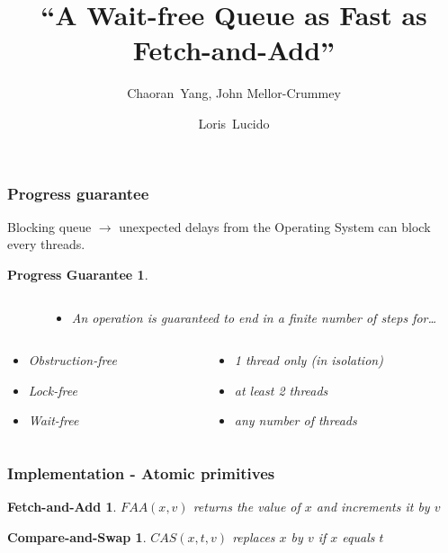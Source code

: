 \documentclass[10pt,a4paper]{beamer}
\title{``A Wait-free Queue as Fast as Fetch-and-Add'' }
\subtitle{Chaoran~Yang, John Mellor-Crummey}
\author[L. Lucido]{Loris~Lucido\\[-.25em]}
\institute[IR]{Lecture d'articles - Soutenance}
\date{\displaydate{date}}
\begin{document}
\begin{frame}
  \vspace{3.5em}
  \titlepage
\end{frame}


\begin{frame}
  \frametitle{Progress guarantee}
  Blocking queue $\rightarrow$ unexpected delays from the Operating System
  can block every threads. \center \vfill
  \newtheorem{progress}[theorem]{Progress Guarantee}
  \begin{progress}
    \center
    \begin{columns}
      \begin{column}{0.3\textwidth}
      \end{column}
      \begin{column}{0.7\textwidth}
        \begin{itemize}
        \item[] An operation is guaranteed to end in a finite number of steps for\ldots
        \end{itemize}
      \end{column}
    \end{columns}
    \medskip
    \begin{columns}
      \begin{column}{0.3\textwidth}
        \begin{itemize}
        \item Obstruction-free
        \item Lock-free
        \item Wait-free
        \end{itemize}
      \end{column}
      \begin{column}{0.7\textwidth}
        \begin{itemize}
        \item[] 1 thread only (in isolation)
        \item[] at least 2 threads
        \item[] any number of threads
        \end{itemize}
      \end{column}
    \end{columns}
  \end{progress}
\end{frame}

\begin{frame}
  \frametitle{Implementation - Atomic primitives}
  \newtheorem{faa}[theorem]{Fetch-and-Add}
  \newtheorem{cas}[theorem]{Compare-and-Swap}
  \begin{faa}
    $FAA(x, v)$ returns the value of $x$ and increments it by $v$
  \end{faa}
  \vfill
  \begin{cas}
    $CAS(x,t,v)$ replaces $x$ by $v$ if $x$ equals $t$
  \end{cas}
\end{frame}
\end{document}
